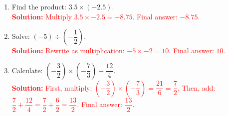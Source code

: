 \documentclass[11pt]{article}
\begin{document}
\begin{tcolorbox}[colframe=black!60, colback=white, 
coltitle=black, colbacktitle=black!15, fonttitle=\bfseries\Large, 
title=Exercises, halign title=center, left=10pt, right=10pt, top=10pt, bottom=60pt]
\begin{enumerate}[itemsep=1em]
    \item Find the product: \( 3.5 \times (-2.5) \).\\
    \textcolor{red}{\textbf{Solution:} Multiply \( 3.5 \times -2.5 = -8.75 \). Final answer: \( -8.75 \).}

    \item Solve: \( (-5) \div (-\dfrac{1}{2}) \).\\
    \textcolor{red}{\textbf{Solution:} Rewrite as multiplication: \( -5 \times -2 = 10 \). Final answer: \( 10 \).}

    \item Calculate: \( (-\dfrac{3}{2}) \times (-\dfrac{7}{3}) + \dfrac{12}{4} \).\\
    \textcolor{red}{\textbf{Solution:} First, multiply: \( (-\dfrac{3}{2}) \times (-\dfrac{7}{3}) = \dfrac{21}{6} = \dfrac{7}{2} \). Then, add: \( \dfrac{7}{2} + \dfrac{12}{4} = \dfrac{7}{2} + \dfrac{6}{2} = \dfrac{13}{2} \). Final answer: \( \dfrac{13}{2} \).}
\end{enumerate}
\end{tcolorbox}

\vspace{1em}
\end{document}
